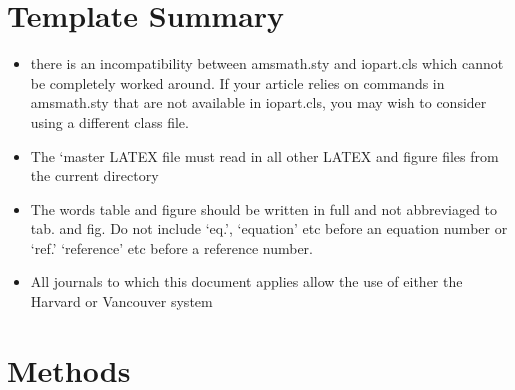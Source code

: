 \documentclass[12pt]{iopart}
\begin{document}
%
%
%
% 
%

\maketitle
 
\section{Template Summary}

\begin{itemize}
  \item there is an incompatibility between amsmath.sty and iopart.cls
  which cannot be completely worked around. If your article relies on commands in
  amsmath.sty that are not available in iopart.cls, you may wish to consider using a
  diﬀerent class ﬁle.
  \item The ‘master LATEX ﬁle
  must read in all other LATEX and ﬁgure ﬁles from the current directory
  \item The words table and ﬁgure should be written in full and not abbreviaged to tab.
  and ﬁg. Do not include ‘eq.’, ‘equation’ etc before an equation number or ‘ref.’
  ‘reference’ etc before a reference number.
  \item All journals to which this document applies allow
  the use of either the Harvard or Vancouver system
\end{itemize}

\section{Methods}



%
%
\end{document}
